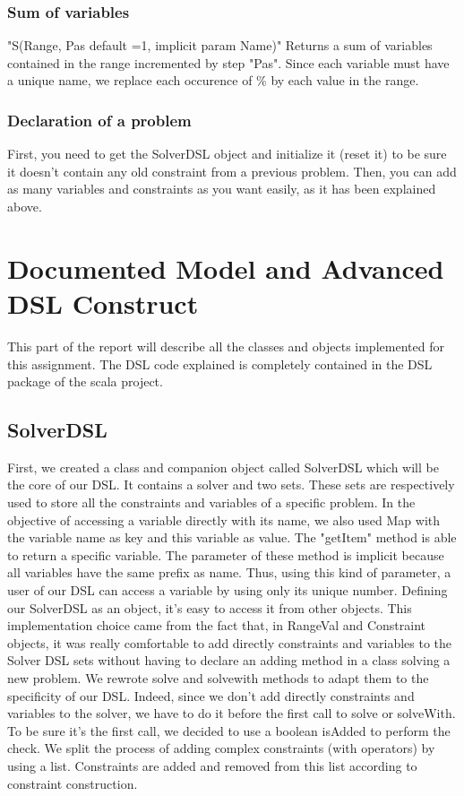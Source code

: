 \subsubsection{Sum of variables}
"S(Range, Pas default =1, implicit param Name)"\newline
Returns a sum of variables contained in the range incremented by step "Pas".
Since each variable must have a unique name, we replace each occurence of \% by each value in the range.
\subsubsection{Declaration of a problem}
First, you need to get the SolverDSL object and initialize it (reset it) to be sure it doesn't contain any old constraint from a previous problem. Then, you can add as many variables and constraints as you want easily, as it has been explained above.\\
\section{Documented Model and Advanced DSL Construct}
This part of the report will describe all the classes and objects implemented for this assignment. The DSL code explained is completely contained in the DSL package of the scala project.
\subsection{SolverDSL}
First, we created a class and companion object called SolverDSL which will be the core of our DSL. It contains a solver and two sets. These sets are respectively used to store all the constraints and variables of a specific problem. In the objective of accessing a variable directly with its name, we also used Map with the variable name as key and this variable as value. The "getItem" method is able to return a specific variable. The parameter of these method is implicit because all variables have the same prefix as name. Thus, using this kind of parameter, a user of our DSL can access a variable by using  only its unique number. Defining our SolverDSL as an object, it's easy to access it from other objects. This implementation choice came from the fact that, in RangeVal and Constraint objects, it was really comfortable to add directly constraints and variables to the Solver DSL sets without having to declare an adding method in a class solving a new problem. We rewrote solve and solvewith methods to adapt them to the specificity of our DSL. Indeed, since we don't add directly constraints and variables to the solver, we have to do it before the first call to solve or solveWith. To be sure it's the first call, we decided to use a boolean isAdded to perform the check. We split the process of adding complex constraints (with operators) by using a list. Constraints are added and removed from this list according to constraint construction.
